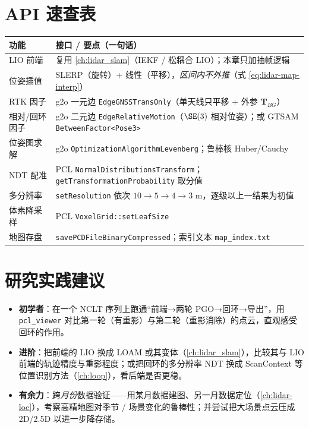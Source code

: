 \section*{API 速查表}
\begin{table}[H]\centering\small
\begin{tabular}{p{} p{}}
\toprule
功能 & 接口 / 要点（一句话） \\
\midrule
LIO 前端 & 复用 \cref{ch:lidar_slam}（IEKF / 松耦合 LIO）；本章只加抽帧逻辑 \\
位姿插值 & SLERP（旋转）+ 线性（平移），\emph{区间内不外推}（式 \ref{eq:lidar-map-interp}）\\
RTK 因子 & g2o 一元边 \texttt{EdgeGNSSTransOnly}（单天线只平移 + 外参 $\mathbf{T}_{BG}$）\\
相对/回环因子 & g2o 二元边 \texttt{EdgeRelativeMotion}（$\SE(3)$ 相对位姿）；或 GTSAM \texttt{BetweenFactor<Pose3>} \\
位姿图求解 & g2o \texttt{OptimizationAlgorithmLevenberg}；鲁棒核 Huber/Cauchy \\
NDT 配准 & PCL \texttt{NormalDistributionsTransform}；\texttt{getTransformationProbability} 取分值 \\
多分辨率 & \texttt{setResolution} 依次 $10\to5\to4\to3$ m，逐级以上一结果为初值 \\
体素降采样 & PCL \texttt{VoxelGrid::setLeafSize} \\
地图存盘 & \texttt{savePCDFileBinaryCompressed}；索引文本 \texttt{map\_index.txt} \\
\bottomrule
\end{tabular}
\end{table}

\section*{研究实践建议}
\begin{itemize}
  \item \textbf{初学者}：在一个 NCLT 序列上跑通“前端→两轮 PGO→回环→导出”，用 \texttt{pcl\_viewer} 对比第一轮（有重影）与第二轮（重影消除）的点云，直观感受回环的作用。
  \item \textbf{进阶}：把前端的 LIO 换成 LOAM 或其变体（\cref{ch:lidar_slam}），比较其与 LIO 前端的轨迹精度与重影程度；或把回环的多分辨率 NDT 换成 ScanContext\cite{kim2018scancontext} 等位置识别方法（\cref{ch:loop}），看后端是否更稳。
  \item \textbf{有余力}：跨\emph{月份}数据验证——用某月数据建图、另一月数据定位（\cref{ch:lidar-loc}），考察高精地图对季节 / 场景变化的鲁棒性；并尝试把大场景点云压成 2D/2.5D 以进一步降存储。
\end{itemize}

